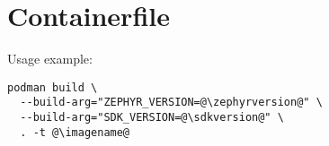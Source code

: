 \newpage

\fancyfoot{}

\section{Containerfile}\label{containerfile}



Usage example:

\begin{lstlisting}
podman build \
  --build-arg="ZEPHYR_VERSION=@\zephyrversion@" \
  --build-arg="SDK_VERSION=@\sdkversion@" \
  . -t @\imagename@
\end{lstlisting}



